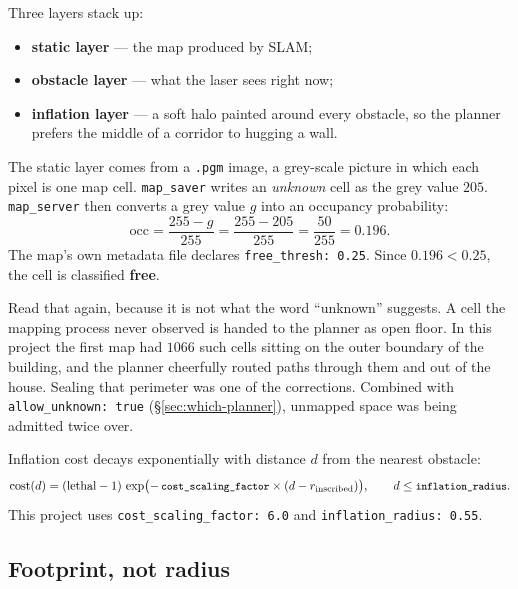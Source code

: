 \documentclass[11pt,a4paper]{report}
\newcommand{\file}[1]{\texttt{\small #1}}
\begin{document}
Three layers stack up:
\begin{itemize}[leftmargin=1.4em,itemsep=2pt]
\item \textbf{static layer} --- the map produced by SLAM;
\item \textbf{obstacle layer} --- what the laser sees right now;
\item \textbf{inflation layer} --- a soft halo painted around every obstacle,
so the planner prefers the middle of a corridor to hugging a wall.
\end{itemize}

\begin{warnbox}
The static layer comes from a \file{.pgm} image, a grey-scale picture in which
each pixel is one map cell. \file{map\_saver} writes an \emph{unknown} cell as
the grey value $205$. \file{map\_server} then converts a grey value $g$ into an
occupancy probability:
\[
\text{occ} = \frac{255 - g}{255} = \frac{255 - 205}{255} = \frac{50}{255}
           = 0.196 .
\]
The map's own metadata file declares \file{free\_thresh: 0.25}. Since
$0.196 < 0.25$, the cell is classified \textbf{free}.

Read that again, because it is not what the word ``unknown'' suggests. A cell
the mapping process never observed is handed to the planner as open floor. In
this project the first map had $1066$ such cells sitting on the outer boundary
of the building, and the planner cheerfully routed paths through them and out
of the house. Sealing that perimeter was one of the corrections. Combined with
\file{allow\_unknown: true} (\S\ref{sec:which-planner}), unmapped space was
being admitted twice over.
\end{warnbox}

Inflation cost decays exponentially with distance $d$ from the nearest
obstacle:
\begin{equation}
\text{cost}(d) = (\text{lethal} - 1)\,
\exp\bigl(-\,\file{cost\_scaling\_factor} \times (d - r_{\text{inscribed}})\bigr),
\qquad d \le \file{inflation\_radius}.
\label{eq:inflation}
\end{equation}
This project uses \file{cost\_scaling\_factor: 6.0} and
\file{inflation\_radius: 0.55}.

\subsection{Footprint, not radius}
\end{document}
